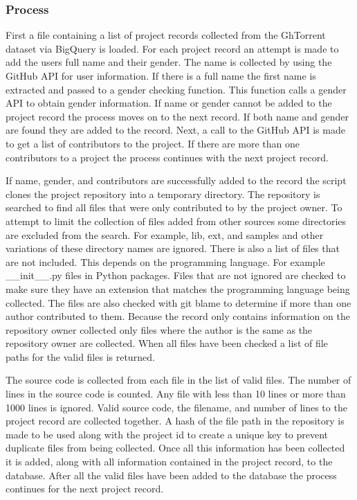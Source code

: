 \documentclass{article}
\begin{document}
\subsubsection*{Process}
First a file containing a list of project records collected from the GhTorrent dataset via BigQuery is loaded. For each project record an attempt is made to add the users full name and their gender. The name is collected by using the GitHub API for user information. If there is a full name the first name is extracted and passed to a gender checking function. This function calls a gender API to obtain gender information. If name or gender cannot be added to the project record the process moves on to the next record. If both name and gender are found they are added to the record. Next, a call to the GitHub API is made to get a list of contributors to the project. If there are more than one contributors to a project the process continues with the next project record.

If name, gender, and contributors are successfully added to the record the script clones the project repository into a temporary directory. The repository is searched to find all files that were only contributed to by the project owner. To attempt to limit the collection of files added from other sources some directories are excluded from the search. For example, lib, ext, and samples and other variations of these directory names are ignored. There is also a list of files that are not included. This depends on the programming language. For example {\_\_}init{\_\_}.py files in Python packages. Files that are not ignored are checked to make sure they have an extension that matches the programming language being collected. The files are also checked with git blame to determine if more than one author contributed to them. Because the record only contains information on the repository owner collected only files where the author is the same as the repository owner are collected. When all files have been checked a list of file paths for the valid files is returned.

The source code is collected from each file in the list of valid files. The number of lines in the source code is counted. Any file with less than 10 lines or more than 1000 lines is ignored. Valid source code, the filename, and number of lines to the project record are collected together. A hash of the file path in the repository is made to be used along with the project id to create a unique key to prevent duplicate files from being collected. Once all this information has been collected it is added, along with all information contained in the project record, to the database. After all the valid files have been added to the database the process continues for the next project record.
\end{document}
